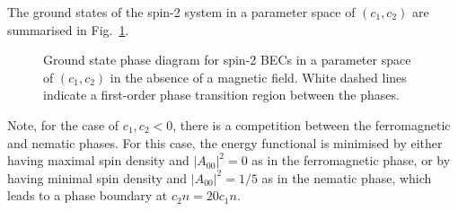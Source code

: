 The ground states of the spin-2 system in a parameter space of \((c_1, c_2)\)
are summarised in Fig.~\ref{fig: spin-2-ground-states}.
\begin{figure}
    \centering
    \caption[Spin-2 ground state phase diagram]
    {\label{fig: spin-2-ground-states}Ground state phase diagram for
        spin-2 BECs in a parameter space of \((c_1, c_2)\) in the absence of a
        magnetic field.
        White dashed lines indicate a first-order phase transition region
        between the phases.}
\end{figure}
Note, for the case of \(c_1, c_2 < 0\), there is a competition between
the ferromagnetic and nematic phases.
For this case, the energy functional is minimised by either having maximal spin
density and \(|A_{00}|^2 = 0\) as in the ferromagnetic phase, or by having
minimal spin density and \(|A_{00}|^2 = 1/5\) as in the nematic phase, which
leads to a phase boundary at \(c_2n=20c_1n\).

